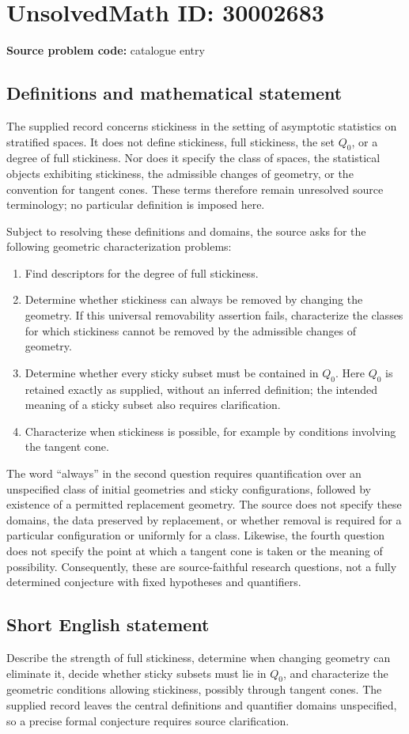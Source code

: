\documentclass[11pt]{article}
\begin{document}
\section*{UnsolvedMath ID: 30002683}
\textbf{Source problem code:} catalogue entry
\subsection{Definitions and mathematical statement}
The supplied record concerns stickiness in the setting of asymptotic statistics on stratified spaces. It does not define stickiness, full stickiness, the set \(Q_0\), or a degree of full stickiness. Nor does it specify the class of spaces, the statistical objects exhibiting stickiness, the admissible changes of geometry, or the convention for tangent cones. These terms therefore remain unresolved source terminology; no particular definition is imposed here.

Subject to resolving these definitions and domains, the source asks for the following geometric characterization problems:
\begin{enumerate}
\item Find descriptors for the degree of full stickiness.
\item Determine whether stickiness can always be removed by changing the geometry. If this universal removability assertion fails, characterize the classes for which stickiness cannot be removed by the admissible changes of geometry.
\item Determine whether every sticky subset must be contained in \(Q_0\). Here \(Q_0\) is retained exactly as supplied, without an inferred definition; the intended meaning of a sticky subset also requires clarification.
\item Characterize when stickiness is possible, for example by conditions involving the tangent cone.
\end{enumerate}
The word ``always'' in the second question requires quantification over an unspecified class of initial geometries and sticky configurations, followed by existence of a permitted replacement geometry. The source does not specify these domains, the data preserved by replacement, or whether removal is required for a particular configuration or uniformly for a class. Likewise, the fourth question does not specify the point at which a tangent cone is taken or the meaning of possibility. Consequently, these are source-faithful research questions, not a fully determined conjecture with fixed hypotheses and quantifiers.
\subsection{Short English statement}
Describe the strength of full stickiness, determine when changing geometry can eliminate it, decide whether sticky subsets must lie in \(Q_0\), and characterize the geometric conditions allowing stickiness, possibly through tangent cones. The supplied record leaves the central definitions and quantifier domains unspecified, so a precise formal conjecture requires source clarification.
\end{document}
